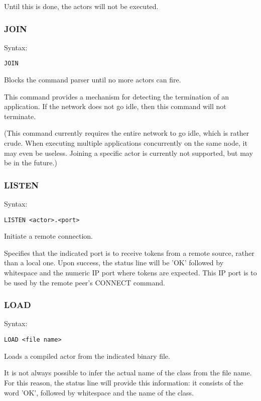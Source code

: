 \documentclass[10pt, a4paper]{article}
\begin{document}
Until this is done, the actors will not be executed.

\subsubsection*{JOIN}

Syntax:
\begin{verbatim}
JOIN
\end{verbatim}

Blocks the command parser until no more actors can fire.

This command provides a mechanism for detecting the termination of an application. If the network does not go idle, then this command will not terminate.

(This command currently requires the entire network to go idle, which is rather crude. When executing multiple applications concurrently on the same node, it may even be useless. Joining a specific actor is currently not supported, but may be in the future.)

\subsubsection*{LISTEN}

Syntax:
\begin{verbatim}
LISTEN <actor>.<port>
\end{verbatim}

Initiate a remote connection.

Specifies that the indicated port is to receive tokens from a remote source, rather than a local one. Upon success, the status line will be 'OK' followed by whitespace and the numeric IP port where tokens are expected. This IP port is to be used by the remote peer's CONNECT command.

\subsubsection*{LOAD}

Syntax:
\begin{verbatim}
LOAD <file name>
\end{verbatim}

Loads a compiled actor from the indicated binary file.

It is not always possible to infer the actual name of the class from the file name. For this reason, the status line will provide this information: it consists of the word 'OK', followed by whitespace and the name of the class.
\end{document}
